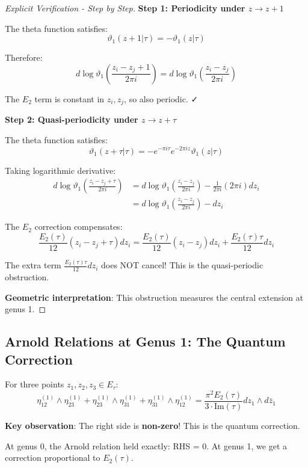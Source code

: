 \begin{proof}[Explicit Verification - Step by Step]

\textbf{Step 1: Periodicity under $z \to z + 1$}

The theta function satisfies:
\begin{equation}
\vartheta_1(z + 1|\tau) = -\vartheta_1(z|\tau)
\end{equation}

Therefore:
\begin{equation}
d\log\vartheta_1\left(\frac{z_i - z_j + 1}{2\pi i}\right) = d\log\vartheta_1\left(\frac{z_i - z_j}{2\pi i}\right)
\end{equation}

The $E_2$ term is constant in $z_i, z_j$, so also periodic. ✓

\textbf{Step 2: Quasi-periodicity under $z \to z + \tau$}

The theta function satisfies:
\begin{equation}
\vartheta_1(z + \tau|\tau) = -e^{-\pi i \tau} e^{-2\pi i z} \vartheta_1(z|\tau)
\end{equation}

Taking logarithmic derivative:
\begin{align}
d\log\vartheta_1\left(\frac{z_i - z_j + \tau}{2\pi i}\right) &= d\log\vartheta_1\left(\frac{z_i - z_j}{2\pi i}\right) 
- \frac{1}{2\pi i}(2\pi i) dz_i \\
&= d\log\vartheta_1\left(\frac{z_i - z_j}{2\pi i}\right) - dz_i
\end{align}

The $E_2$ correction compensates:
\begin{equation}
\frac{E_2(\tau)}{12}(z_i - z_j + \tau) dz_i = \frac{E_2(\tau)}{12}(z_i - z_j) dz_i + \frac{E_2(\tau) \tau}{12} dz_i
\end{equation}

The extra term $\frac{E_2(\tau) \tau}{12} dz_i$ does NOT cancel! This is the quasi-periodic obstruction.

\textbf{Geometric interpretation}: This obstruction measures the central extension at genus 1.
\end{proof}

\subsection{Arnold Relations at Genus 1: The Quantum Correction}

\begin{theorem}
\label{thm:arnold-genus1}
For three points $z_1, z_2, z_3 \in E_\tau$:
\begin{equation}
\eta_{12}^{(1)} \wedge \eta_{23}^{(1)} + \eta_{23}^{(1)} \wedge \eta_{31}^{(1)} 
+ \eta_{31}^{(1)} \wedge \eta_{12}^{(1)} = \frac{\pi^2 E_2(\tau)}{3 \cdot \text{Im}(\tau)} dz_1 \wedge d\bar{z}_1
\end{equation}

\textbf{Key observation}: The right side is \textbf{non-zero}! This is the quantum correction.

At genus 0, the Arnold relation held exactly: RHS = 0.
At genus 1, we get a correction proportional to $E_2(\tau)$.
\end{theorem}

